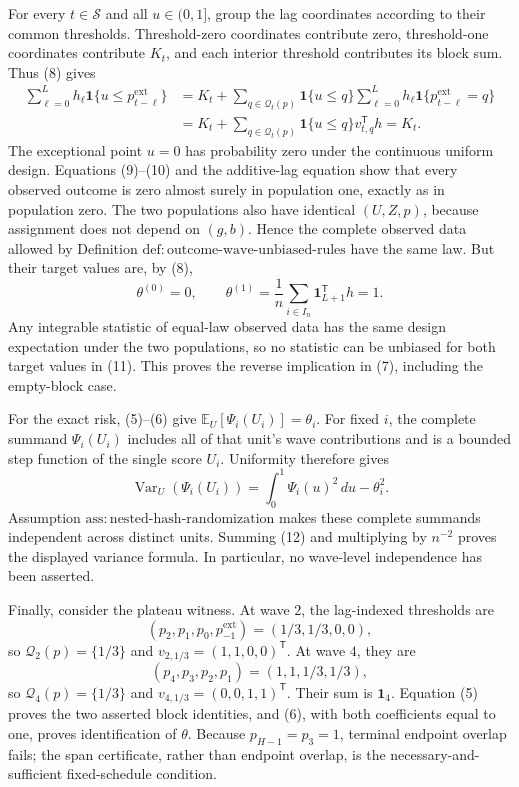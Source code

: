 For every \(t\in\mathcal S\) and all \(u\in(0,1]\), group the lag coordinates according to their common thresholds.  Threshold-zero coordinates contribute zero, threshold-one coordinates contribute \(K_t\), and each interior threshold contributes its block sum.  Thus (8) gives
\[
 \begin{aligned}
 \sum_{\ell=0}^{L}h_\ell\mathbf 1\{u\le p^{\mathrm{ext}}_{t-\ell}\}
 &=K_t+
   \sum_{q\in\mathcal Q_t(p)}
      \mathbf 1\{u\le q\}
      \sum_{\ell=0}^{L}h_\ell
      \mathbf 1\{p^{\mathrm{ext}}_{t-\ell}=q\}\\
 &=K_t+
   \sum_{q\in\mathcal Q_t(p)}
      \mathbf 1\{u\le q\}v_{t,q}^{\mathsf T}h
 =K_t.
 \end{aligned}
\tag{10}
\]
The exceptional point \(u=0\) has probability zero under the continuous uniform design.  Equations (9)--(10) and the additive-lag equation show that every observed outcome is zero almost surely in population one, exactly as in population zero.  The two populations also have identical \((U,Z,p)\), because assignment does not depend on \((g,b)\).  Hence the complete observed data allowed by Definition \(\mathrm{def:outcome\text{-}wave\text{-}unbiased\text{-}rules}\) have the same law.  But their target values are, by (8),
\[
 \theta^{(0)}=0,
 \qquad
 \theta^{(1)}=\frac1n\sum_{i\in I_n}\mathbf 1_{L+1}^{\mathsf T}h=1.
\tag{11}
\]
Any integrable statistic of equal-law observed data has the same design expectation under the two populations, so no statistic can be unbiased for both target values in (11).  This proves the reverse implication in (7), including the empty-block case.

For the exact risk, (5)--(6) give \(\mathbb E_U[\Psi_i(U_i)]=\theta_i\).  For fixed \(i\), the complete summand \(\Psi_i(U_i)\) includes all of that unit's wave contributions and is a bounded step function of the single score \(U_i\).  Uniformity therefore gives
\[
 \operatorname{Var}_U(\Psi_i(U_i))
 =\int_0^1\Psi_i(u)^2\,du-\theta_i^2.
\tag{12}
\]
Assumption \(\mathrm{ass:nested\text{-}hash\text{-}randomization}\) makes these complete summands independent across distinct units.  Summing (12) and multiplying by \(n^{-2}\) proves the displayed variance formula.  In particular, no wave-level independence has been asserted.

Finally, consider the plateau witness.  At wave \(2\), the lag-indexed thresholds are
\[
 (p_2,p_1,p_0,p^{\mathrm{ext}}_{-1})=(1/3,1/3,0,0),
\]
so \(\mathcal Q_2(p)=\{1/3\}\) and \(v_{2,1/3}=(1,1,0,0)^{\mathsf T}\).  At wave \(4\), they are
\[
 (p_4,p_3,p_2,p_1)=(1,1,1/3,1/3),
\]
so \(\mathcal Q_4(p)=\{1/3\}\) and \(v_{4,1/3}=(0,0,1,1)^{\mathsf T}\).  Their sum is \(\mathbf 1_4\).  Equation (5) proves the two asserted block identities, and (6), with both coefficients equal to one, proves identification of \(\theta\).  Because \(p_{H-1}=p_3=1\), terminal endpoint overlap fails; the span certificate, rather than endpoint overlap, is the necessary-and-sufficient fixed-schedule condition.